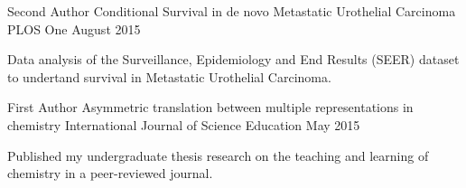 

\begin{cventries}

  \cventry
    {Second Author} %
    {Conditional Survival in de novo Metastatic Urothelial Carcinoma} %
    {PLOS One} %
    {August 2015} %
    {
      \begin{cvitems} %
        \item {Data analysis of the Surveillance, Epidemiology and End Results (SEER) dataset to undertand survival in Metastatic Urothelial Carcinoma.}
      \end{cvitems}
    }

  \cventry
    {First Author} %
    {Asymmetric translation between multiple representations in chemistry} %
    {International Journal of Science Education} %
    {May 2015} %
    {
      \begin{cvitems} %
        \item {Published my undergraduate thesis research on the teaching and learning of chemistry in a peer-reviewed journal.}
      \end{cvitems}
    }
      
    
\end{cventries}
